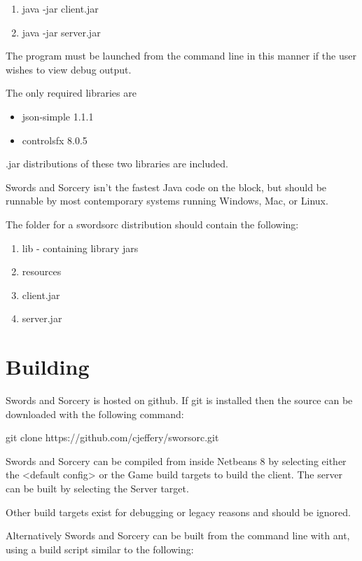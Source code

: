 \documentclass[12pt,a4paper]{article}
\begin{document}
\begin{enumerate}
\item{java -jar client.jar}
\item{java -jar server.jar}
\end{enumerate}

The program must be launched from the command line in this manner if the user
wishes to view debug output.

The only required libraries are

\begin{itemize}
	\item json-simple 1.1.1
	\item controlsfx 8.0.5
\end{itemize}

.jar distributions of these two libraries are included.

Swords and Sorcery isn't the fastest Java code on the block, but should be
runnable by most contemporary systems running Windows, Mac, or Linux.

The folder for a swordsorc distribution should contain the following:

\begin{enumerate}
\item{lib - containing library jars}
\item{resources}
\item{client.jar}
\item{server.jar}
\end{enumerate}
\section{Building}
Swords and Sorcery is hosted on github. If git is installed then the source can
be downloaded with the following command:

    git clone https://github.com/cjeffery/sworsorc.git

Swords and Sorcery can be compiled from inside Netbeans 8 by selecting either
the <default config> or the Game build targets to build the client. The server
can be built by selecting the Server target.

Other build targets exist for debugging or legacy reasons and should be ignored.

Alternatively Swords and Sorcery can be built from the command line with ant,
using a build script similar to the following:
\end{document}
